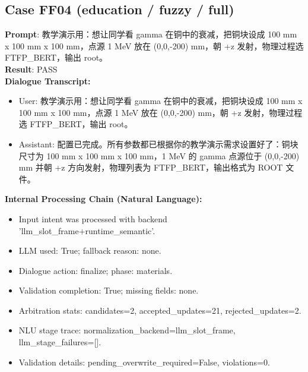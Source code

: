 \documentclass[11pt]{ctexart}
\begin{document}
\subsection{Case FF04 (education / fuzzy / full)}
\textbf{Prompt}: 教学演示用：想让同学看 gamma 在铜中的衰减，把铜块设成 100 mm x 100 mm x 100 mm，点源 1 MeV 放在 (0,0,-200) mm，朝 +z 发射，物理过程选 FTFP\_BERT，输出 root。\\
\textbf{Result}: PASS\\
\textbf{Dialogue Transcript:}
\begin{itemize}
\item User: 教学演示用：想让同学看 gamma 在铜中的衰减，把铜块设成 100 mm x 100 mm x 100 mm，点源 1 MeV 放在 (0,0,-200) mm，朝 +z 发射，物理过程选 FTFP\_BERT，输出 root。
\item Assistant: 配置已完成。所有参数都已根据你的教学演示需求设置好了：铜块尺寸为 100 mm x 100 mm x 100 mm，1 MeV 的 gamma 点源位于 (0,0,-200) mm 并朝 +z 方向发射，物理列表为 FTFP\_BERT，输出格式为 ROOT 文件。
\end{itemize}
\textbf{Internal Processing Chain (Natural Language):}
\begin{itemize}
\item Input intent was processed with backend 'llm\_slot\_frame+runtime\_semantic'.
\item LLM used: True; fallback reason: none.
\item Dialogue action: finalize; phase: materials.
\item Validation completion: True; missing fields: none.
\item Arbitration stats: candidates=2, accepted\_updates=21, rejected\_updates=2.
\item NLU stage trace: normalization\_backend=llm\_slot\_frame, llm\_stage\_failures=[].
\item Validation details: pending\_overwrite\_required=False, violations=0.
\end{itemize}
\end{document}
